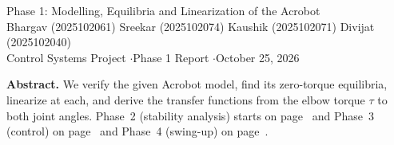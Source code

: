 \documentclass[10pt,letterpaper]{article}
\begin{document}
\begin{center}
\begin{singlespace}
{\fontsize{17}{20}\selectfont Phase 1: Modelling, Equilibria and Linearization of the Acrobot}\\[4pt]
{\small Bhargav (2025102061) \quad Sreekar (2025102074) \quad Kaushik (2025102071) \quad Divijat (2025102040)}\\[1pt]
{\footnotesize Control Systems Project \quad$\cdot$\quad Phase 1 Report \quad$\cdot$\quad October 25, 2026}
\end{singlespace}
\end{center}
\vspace{-6pt}
{\small\textbf{Abstract.} We verify the given Acrobot model, find its zero-torque equilibria, linearize at each, and derive the transfer functions from the elbow torque $\tau$ to both joint angles. Phase~2 (stability analysis) starts on page~\pageref{phase2} and Phase~3 (control) on page~\pageref{phase3} and Phase~4 (swing-up) on page~\pageref{phase4}.\par}

\end{document}
